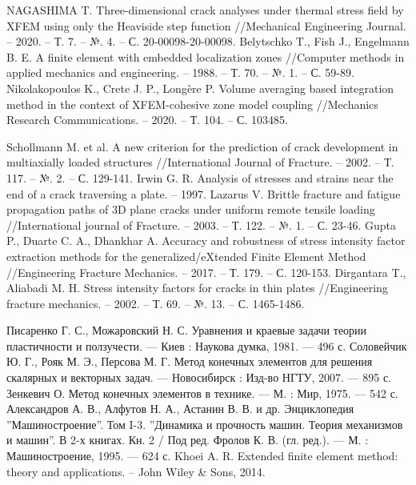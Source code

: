 \begin{thebibliography}{3}
NAGASHIMA T. Three-dimensional crack analyses under thermal stress field by XFEM using only the Heaviside step function //Mechanical Engineering Journal. – 2020. – Т. 7. – №. 4. – С. 20-00098-20-00098.
Belytschko T., Fish J., Engelmann B. E. A finite element with embedded localization zones //Computer methods in applied mechanics and engineering. – 1988. – Т. 70. – №. 1. – С. 59-89.
Nikolakopoulos K., Crete J. P., Longère P. Volume averaging based integration method in the context of XFEM-cohesive zone model coupling //Mechanics Research Communications. – 2020. – Т. 104. – С. 103485.


Schollmann M. et al. A new criterion for the prediction of crack development in multiaxially loaded structures //International Journal of Fracture. – 2002. – Т. 117. – №. 2. – С. 129-141.
Irwin G. R. Analysis of stresses and strains near the end of a crack traversing a plate. – 1997.
Lazarus V. Brittle fracture and fatigue propagation paths of 3D plane cracks under uniform remote tensile loading //International journal of Fracture. – 2003. – Т. 122. – №. 1. – С. 23-46.
Gupta P., Duarte C. A., Dhankhar A. Accuracy and robustness of stress intensity factor extraction methods for the generalized/eXtended Finite Element Method //Engineering Fracture Mechanics. – 2017. – Т. 179. – С. 120-153.
Dirgantara T., Aliabadi M. H. Stress intensity factors for cracks in thin plates //Engineering fracture mechanics. – 2002. – Т. 69. – №. 13. – С. 1465-1486.


Писаренко Г. С., Можаровский Н. С. Уравнения и краевые задачи теории пластичности и ползучести. --- Киев : Наукова думка, 1981. --- 496 с.
Соловейчик Ю. Г., Рояк М. Э., Персова М. Г. Метод конечных элементов для решения скалярных и векторных задач. --- Новосибирск : Изд-­во НГТУ, 2007. --- 895 с.
Зенкевич О. Метод конечных элементов в технике. --- М. : Мир, 1975. --- 542 с.
Александров А. В., Алфутов Н. А., Астанин В. В. и др. Энциклопедия ”Машиностроение”. Том I-­3. ”Динамика и прочность машин. Теория механизмов и машин”. В 2-­х книгах. Кн. 2 / Под ред. Фролов К. В. (гл. ред.). --- М. : Машиностроение, 1995. --- 624 с.
Khoei A. R. Extended finite element method: theory and applications. – John Wiley \& Sons, 2014.
	
\end{thebibliography}

